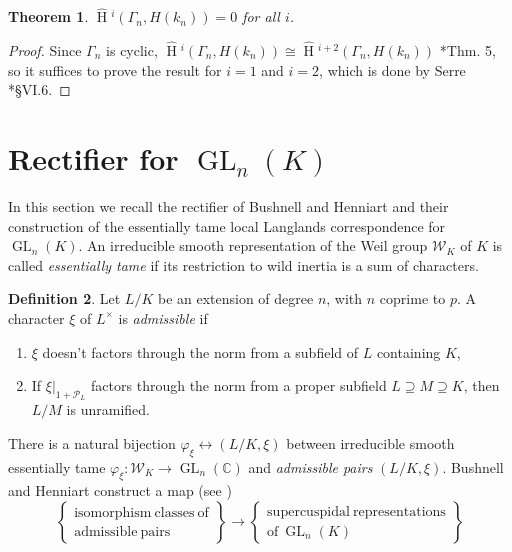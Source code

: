 \documentclass{mrlart7}
\theoremstyle{plain}
\newtheorem{theorem}{Theorem}[section]
\newcommand{\HT}[1]{\hat{\HH}{}^{#1}}
\theoremstyle{definition}
\newtheorem{definition}[theorem]{Definition}
\numberwithin{equation}{section}
\DeclareMathOperator{\HH}{H}
\DeclareMathOperator{\GL}{GL}
\newcommand{\PL}{\mathcal{P}_L}
\newcommand{\Weil}{\mathcal{W}}
\begin{document}
\begin{theorem} \label{thm:lang}
$\HT{i}(\Gamma_n, H(k_n)) = 0$ for all $i$.
\end{theorem}
\begin{proof}
Since $\Gamma_n$ is cyclic,
$\HT{i}(\Gamma_n, H(k_n)) \cong \HT{i+2}(\Gamma_n, H(k_n))$ \cite{atiyah-wall:CohomologyGrps}*{Thm. 5},
so it suffices to prove the result for $i=1$ and $i=2$, which is done
by Serre \cite{serre:AlgGrpsClassFields}*{\S VI.6}.
\end{proof}

\section{Rectifier for $\GL_{n}(K)$} \label{section:BH_recall}

In this section we recall the rectifier of Bushnell and Henniart and their construction of the
essentially tame local Langlands correspondence for $\GL_{n}(K)$.
An irreducible smooth representation of the Weil group $\Weil_K$ of $K$ is
called \emph{essentially tame} if its restriction to wild inertia is a
sum of characters.
\begin{definition}\label{admissiblepairhowe}
Let $L/K$ be an extension of degree $n$, with $n$ coprime to $p$.  A character
$\xi$ of $L^\times$ is \emph{admissible} if
\begin{enumerate}
\item $\xi$ doesn't factors through the norm from a subfield of $L$ containing $K$,
\item If $\xi|_{1 + \PL}$ factors through the norm from a proper subfield $L \supseteq M \supseteq K$, then
$L/M$ is unramified.
\end{enumerate}
\end{definition}
There is a natural bijection
$\varphi_{\xi} \leftrightarrow (L/K, \xi)$ between irreducible smooth essentially tame
$\varphi_{\xi} : \Weil_K \rightarrow \GL_{n}(\mathbb{C})$ and
\emph{admissible pairs} $(L/K, \xi)$.
Bushnell and Henniart
construct a map (see \cite{bushnell-henniart:10a})
\begin{equation*}
\left\{
\begin{array}{cc}
\mathrm{isomorphism \ classes \ of} \\
\mathrm{admissible \ pairs}
\end{array}
\right\} \rightarrow \left\{
\begin{array}{cc}
\mathrm{supercuspidal \ representations} \\
\mathrm{of} \ \GL_{n}(K)
\end{array} \right\}
\end{equation*}
\end{document}

